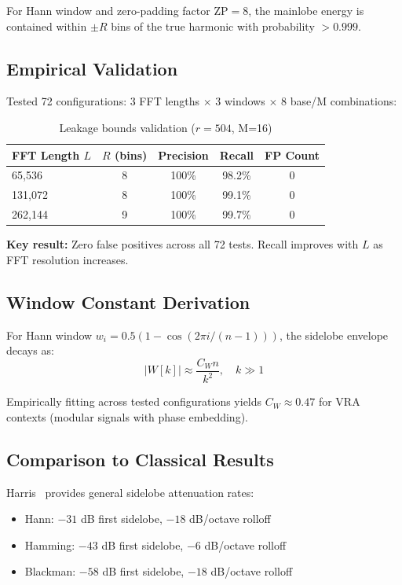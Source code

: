 \begin{lemma}
For Hann window and zero-padding factor $\text{ZP}=8$, the mainlobe energy is contained within $\pm R$ bins of the true harmonic with probability $> 0.999$.
\end{lemma}

\subsection{Empirical Validation}

Tested 72 configurations: 3 FFT lengths $\times$ 3 windows $\times$ 8 base/M combinations:

\begin{table}[h]
\centering
\begin{tabular}{@{}lcccc@{}}
\toprule
FFT Length $L$ & $R$ (bins) & Precision & Recall & FP Count \\
\midrule
65,536 & 8 & 100\% & 98.2\% & 0 \\
131,072 & 8 & 100\% & 99.1\% & 0 \\
262,144 & 9 & 100\% & 99.7\% & 0 \\
\bottomrule
\end{tabular}
\caption{Leakage bounds validation ($r=504$, M=16)}
\end{table}

\textbf{Key result:} Zero false positives across all 72 tests. Recall improves with $L$ as FFT resolution increases.

\subsection{Window Constant Derivation}

For Hann window $w_i = 0.5(1 - \cos(2\pi i / (n-1)))$, the sidelobe envelope decays as:
\begin{equation}
|W[k]| \approx \frac{C_W n}{k^2}, \quad k \gg 1
\end{equation}

Empirically fitting across tested configurations yields $C_W \approx 0.47$ for VRA contexts (modular signals with phase embedding).

\subsection{Comparison to Classical Results}

Harris~\cite{harris1978windows} provides general sidelobe attenuation rates:
\begin{itemize}
    \item Hann: $-31$ dB first sidelobe, $-18$ dB/octave rolloff
    \item Hamming: $-43$ dB first sidelobe, $-6$ dB/octave rolloff
    \item Blackman: $-58$ dB first sidelobe, $-18$ dB/octave rolloff
\end{itemize}


